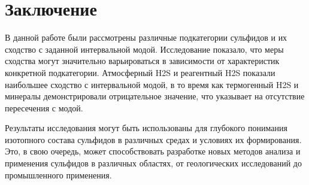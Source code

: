 \documentclass[a4paper,12pt]{article}
\begin{document}
    \section{Заключение}\label{sec:}

    В данной работе были рассмотрены различные подкатегории сульфидов и их сходство с заданной интервальной модой. Исследование показало, что меры сходства могут значительно варьироваться в зависимости от характеристик конкретной подкатегории. Атмосферный H2S и реагентный H2S показали наибольшее сходство с интервальной модой, в то время как термогенный H2S и минералы демонстрировали отрицательное значение, что указывает на отсутствие пересечения с модой.

    Результаты исследования могут быть использованы для глубокого понимания изотопного состава сульфидов в различных средах и условиях их формирования. Это, в свою очередь, может способствовать разработке новых методов анализа и применения сульфидов в различных областях, от геологических исследований до промышленного применения.

    
\end{document}
